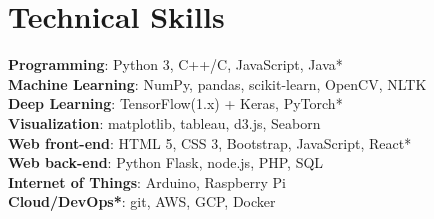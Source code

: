 \documentclass[letterpaper,11pt, ]{article}
\begin{document}
\section{Technical Skills}

\begin{multicols}{2}
 \begin{itemize}[leftmargin=0.15in, label={}]
    \small{\item{
        \textbf{Programming}{: Python 3, C++/C, JavaScript, Java* \\
        \textbf{Machine Learning}{: NumPy, pandas, scikit-learn, OpenCV, NLTK} \\
        \textbf{Deep Learning}{: TensorFlow(1.x) + Keras, PyTorch*} \\
        \textbf{Visualization}{: matplotlib, tableau, d3.js, Seaborn} \\
        
        
        \textbf{Web front-end}{: HTML 5, CSS 3, Bootstrap, JavaScript, React*} \\
        \textbf{Web back-end}{: Python Flask, node.js, PHP, SQL} \\
        \textbf{Internet of Things}{: Arduino, Raspberry Pi} \\
        \textbf{Cloud/DevOps*}{: git, AWS, GCP, Docker} \\
    }}}
 \end{itemize}
\end{multicols}
\vspace{-5pt}
\vspace{-10pt}
\end{document}
